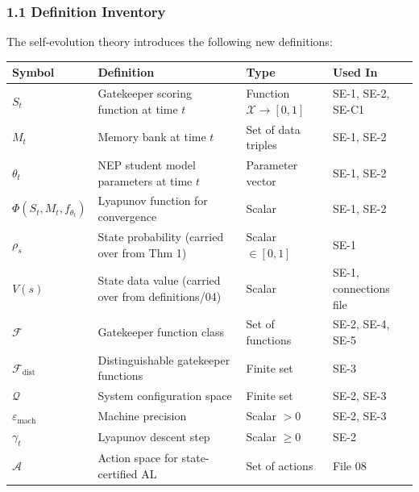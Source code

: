 \documentclass[
  12pt,
]{ctexart}
\begin{document}
\subsubsection{1.1 Definition Inventory}\label{definition-inventory}

The self-evolution theory introduces the following new definitions:

\begin{longtable}[]{@{}
  >{\raggedright\arraybackslash}p{}
  >{\raggedright\arraybackslash}p{}
  >{\raggedright\arraybackslash}p{}
  >{\raggedright\arraybackslash}p{}@{}}
\toprule\noalign{}
\begin{minipage}[b]{\linewidth}\raggedright
Symbol
\end{minipage} & \begin{minipage}[b]{\linewidth}\raggedright
Definition
\end{minipage} & \begin{minipage}[b]{\linewidth}\raggedright
Type
\end{minipage} & \begin{minipage}[b]{\linewidth}\raggedright
Used In
\end{minipage} \\
\midrule\noalign{}
\endhead
\bottomrule\noalign{}
\endlastfoot
\(S_t\) & Gatekeeper scoring function at time \(t\) & Function
\(\mathcal{X} \to [0,1]\) & SE-1, SE-2, SE-C1 \\
\(M_t\) & Memory bank at time \(t\) & Set of data triples & SE-1,
SE-2 \\
\(\theta_t\) & NEP student model parameters at time \(t\) & Parameter
vector & SE-1, SE-2 \\
\(\Phi(S_t, M_t, f_{\theta_t})\) & Lyapunov function for convergence &
Scalar & SE-1, SE-2 \\
\(\rho_s\) & State probability (carried over from Thm 1) & Scalar
\(\in [0,1]\) & SE-1 \\
\(V(s)\) & State data value (carried over from definitions/04) & Scalar
& SE-1, connections file \\
\(\mathcal{F}\) & Gatekeeper function class & Set of functions & SE-2,
SE-4, SE-5 \\
\(\mathcal{F}_{\text{dist}}\) & Distinguishable gatekeeper functions &
Finite set & SE-3 \\
\(\mathcal{Q}\) & System configuration space & Finite set & SE-2,
SE-3 \\
\(\varepsilon_{\text{mach}}\) & Machine precision & Scalar \(> 0\) &
SE-2, SE-3 \\
\(\gamma_t\) & Lyapunov descent step & Scalar \(\geq 0\) & SE-2 \\
\(\mathcal{A}\) & Action space for state-certified AL & Set of actions &
File 08 \\
\end{longtable}
\end{document}
